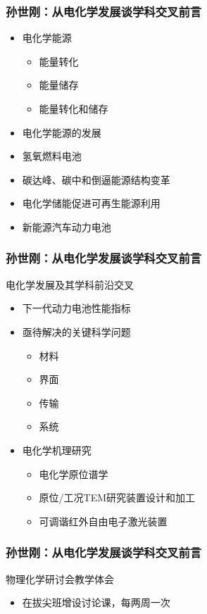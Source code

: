 \documentclass[dvipsnames, svgnames, x11names]{beamer}
\begin{document}
\begin{frame}
    \frametitle{孙世刚：从电化学发展谈学科交叉前言}
    
    \begin{itemize}
      \item 电化学能源
        \begin{itemize}
          \item 能量转化
          \item 能量储存
          \item 能量转化和储存
        \end{itemize}
      \item 电化学能源的发展
      \item 氢氧燃料电池
      \item 碳达峰、碳中和倒逼能源结构变革
      \item 电化学储能促进可再生能源利用
      \item 新能源汽车动力电池
    \end{itemize}
\end{frame}


\begin{frame}
    \frametitle{孙世刚：从电化学发展谈学科交叉前言}
    电化学发展及其学科前沿交叉
    \begin{itemize}
      \item 下一代动力电池性能指标
      \item 亟待解决的关键科学问题
        \begin{itemize}
          \item 材料
          \item 界面
          \item 传输
          \item 系统
        \end{itemize}
      \item 电化学机理研究
        \begin{itemize}
          \item 电化学原位谱学
          \item 原位/工况TEM研究装置设计和加工
          \item 可调谐红外自由电子激光装置
        \end{itemize}
      \end{itemize}
\end{frame}


\begin{frame}
    \frametitle{孙世刚：从电化学发展谈学科交叉前言}
    物理化学研讨会教学体会
    \begin{itemize}
      \item 在拔尖班增设讨论课，每两周一次
    \end{itemize}
\end{frame}
\end{document}
